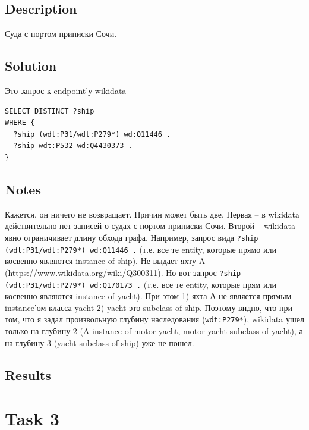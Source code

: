 \documentclass{article}
\begin{document}
\subsection*{Description}

Суда с портом приписки Сочи.

\subsection*{Solution}

Это запрос к endpoint'у wikidata

\begin{verbatim}
SELECT DISTINCT ?ship
WHERE {
  ?ship (wdt:P31/wdt:P279*) wd:Q11446 .
  ?ship wdt:P532 wd:Q4430373 .
}
\end{verbatim}

\subsection*{Notes}
Кажется, он ничего не возвращает. Причин может быть две. Первая -- в wikidata действительно нет записей о судах с
портом приписки Сочи. Второй -- wikidata явно ограничивает длину обхода графа. Например, запрос вида \texttt{?ship (wdt:P31/wdt:P279*) wd:Q11446 .} (т.е. все те entity, которые прямо или косвенно являются instance of ship). Не выдает яхту A (\url{https://www.wikidata.org/wiki/Q300311}). Но вот запрос \texttt{?ship (wdt:P31/wdt:P279*) wd:Q170173 .} (т.е. все те entity, которые прям или косвенно являются instance of yacht). При этом 1) яхта А не является прямым instance'ом класса yacht 2) yacht это subclass of ship. Поэтому видно, что при том, что я задал произвольную глубину наследования (\texttt{wdt:P279*}),
wikidata ушел только на глубину 2 (A instance of motor yacht, motor yacht subclass of yacht), а на глубину 3 (yacht subclass of ship) уже не пошел.
\subsection*{Results}

\noindent{}

\section*{Task 3}
\end{document}
